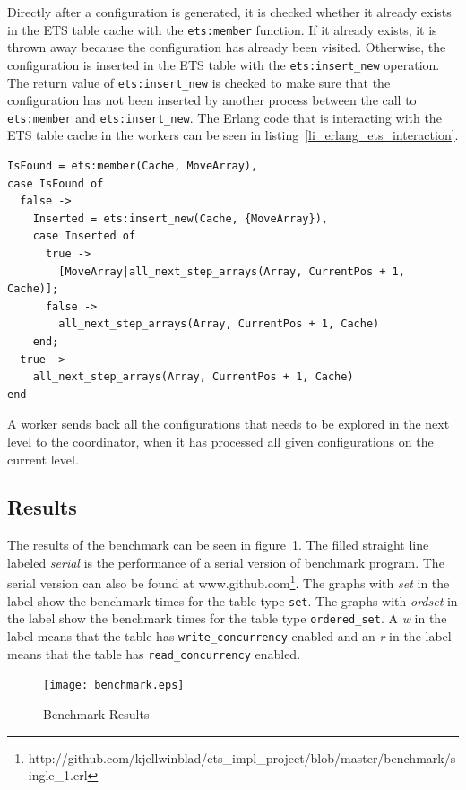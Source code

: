 \documentclass[aps,pre,preprint,nofootinbib]{revtex4}
\begin{document}
    Directly after a configuration is generated, it is checked whether it already exists in the ETS table cache with the \verb|ets:member| function.
    If it already exists, it is thrown away because the configuration has already been visited.
    Otherwise, the configuration is inserted in the ETS table with the \verb|ets:insert_new| operation.
    The return value of \verb|ets:insert_new| is checked to make sure that the configuration has not been inserted by another process between the call to \verb|ets:member| and \verb|ets:insert_new|.
    The Erlang code that is interacting with the ETS table cache in the workers can be seen in listing~\ref{li_erlang_ets_interaction}.

    \lstset{language=erlang, caption=Worker code that is interacting with ETS, label=li_erlang_ets_interaction} 
\begin{lstlisting}[float=htb] 
IsFound = ets:member(Cache, MoveArray),
case IsFound of
  false ->
    Inserted = ets:insert_new(Cache, {MoveArray}),
    case Inserted of
      true ->
        [MoveArray|all_next_step_arrays(Array, CurrentPos + 1, Cache)];
      false ->
        all_next_step_arrays(Array, CurrentPos + 1, Cache)
    end;
  true ->
    all_next_step_arrays(Array, CurrentPos + 1, Cache)
end
\end{lstlisting}
    
    A worker sends back all the configurations that needs to be explored in the next level to the coordinator, when it has processed all given configurations on the current level.


\subsection{Results}

  The results of the benchmark can be seen in figure~\ref{fig:benchmark_results}.
  The filled straight line labeled \emph{serial} is the performance of a serial version of benchmark program.
  The serial version can also be found at www.github.com\footnote{http://github.com/kjellwinblad/ets\_impl\_project/blob/master/benchmark/single\_1.erl}.
  The graphs with \emph{set} in the label show the benchmark times for the table type \verb|set|.
  The graphs with \emph{ordset} in the label show the benchmark times for the table type \verb|ordered_set|.
  A \emph{w} in the label means that the table has \verb|write_concurrency| enabled and an \emph{r} in the label means that the table has \verb|read_concurrency| enabled.
  
  
\begin{figure}[htb]
\centering
\texttt{[image: benchmark.eps]}
\caption{Benchmark Results} 
\label{fig:benchmark_results}
\end{figure}
\end{document}
